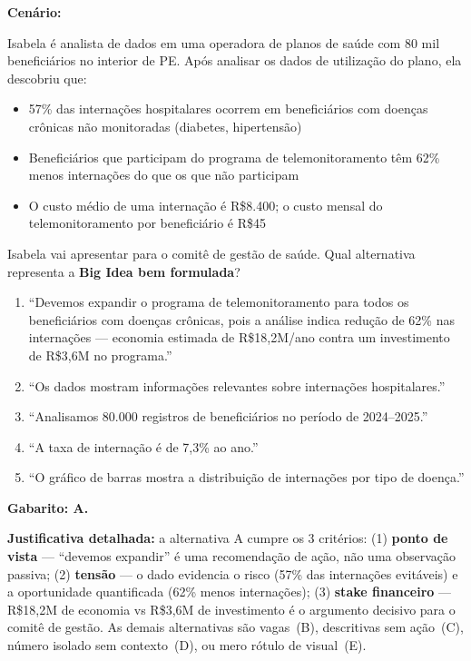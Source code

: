 \begin{SolvedBox}
\textbf{Cenário:}

Isabela é analista de dados em uma operadora de planos de saúde com 80 mil beneficiários
no interior de PE. Após analisar os dados de utilização do plano, ela descobriu que:
\begin{itemize}
  \item 57\% das internações hospitalares ocorrem em beneficiários com doenças crônicas
  não monitoradas (diabetes, hipertensão)
  \item Beneficiários que participam do programa de telemonitoramento têm 62\% menos
  internações do que os que não participam
  \item O custo médio de uma internação é R\$8.400; o custo mensal do telemonitoramento
  por beneficiário é R\$45
\end{itemize}

Isabela vai apresentar para o comitê de gestão de saúde. Qual alternativa representa
a \textbf{Big Idea bem formulada}?

\begin{enumerate}[label=\Alph*)]
  \item ``Devemos expandir o programa de telemonitoramento para todos os beneficiários
  com doenças crônicas, pois a análise indica redução de 62\% nas internações — economia
  estimada de R\$18,2M/ano contra um investimento de R\$3,6M no programa.''
  \item ``Os dados mostram informações relevantes sobre internações hospitalares.''
  \item ``Analisamos 80.000 registros de beneficiários no período de 2024–2025.''
  \item ``A taxa de internação é de 7,3\% ao ano.''
  \item ``O gráfico de barras mostra a distribuição de internações por tipo de doença.''
\end{enumerate}

\medskip
\textbf{Gabarito: A.}

\textbf{Justificativa detalhada:} a alternativa A cumpre os 3 critérios:
(1) \textbf{ponto de vista} — ``devemos expandir'' é uma recomendação de ação, não uma
observação passiva; (2) \textbf{tensão} — o dado evidencia o risco (57\% das internações
evitáveis) e a oportunidade quantificada (62\% menos internações); (3) \textbf{stake
financeiro} — R\$18,2M de economia vs R\$3,6M de investimento é o argumento decisivo
para o comitê de gestão. As demais alternativas são vagas~(B), descritivas sem ação~(C),
número isolado sem contexto~(D), ou mero rótulo de visual~(E).
\end{SolvedBox}

